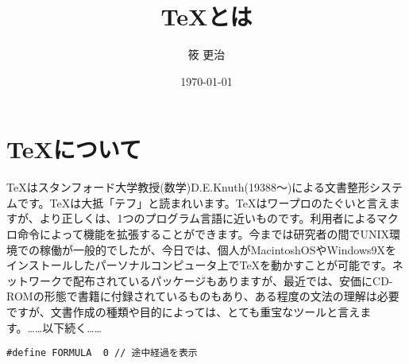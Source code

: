 \documentclass[twocolumn,10pt]{jarticle}
\title{\TeX とは}
\author{筱 更治}
\date{\today}
\begin{document}
 
\maketitle 
\section{\TeX について}

TeXはスタンフォード大学教授(数学)D.E.Knuth(19388～)による文書整形システムです。TeXは大抵「テフ」と読まれいます。TeXはワープロのたぐいと言えますが、より正しくは、1つのプログラム言語に近いものです。利用者によるマクロ命令によって機能を拡張することができます。今までは研究者の間でUNIX環境での稼働が一般的でしたが、今日では、個人がMacintoshOSやWindows9Xをインストールしたパーソナルコンピュータ上でTeXを動かすことが可能です。ネットワークで配布されているパッケージもありますが、最近では、安価にCD-ROMの形態で書籍に付録されているものもあり、ある程度の文法の理解は必要ですが、文書作成の種類や目的によっては、とても重宝なツールと言えます。……以下続く…… 

\begin{lstlisting}[caption=FORMURAの定義]
#define FORMULA  0 // 途中経過を表示
\end{lstlisting}


\end{document}
